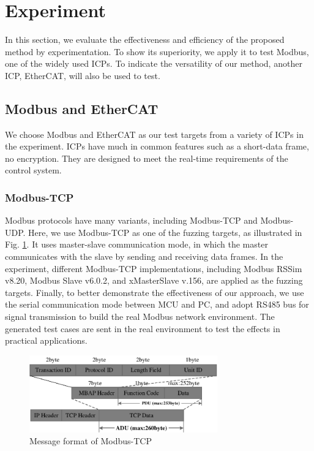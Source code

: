 \section{Experiment}
In this section, we evaluate the effectiveness and efficiency of the proposed method by experimentation. To show its superiority, we apply it to test Modbus, one of the widely used ICPs. To indicate the versatility of our method, another ICP, EtherCAT, will also be used to test.

\subsection{Modbus and EtherCAT}
We choose Modbus and EtherCAT as our test targets from a variety of ICPs in the experiment. ICPs have much in common features such as a short-data frame, no encryption. They are designed to meet the real-time requirements of the control system.
\subsubsection{Modbus-TCP}
Modbus protocols have many variants, including Modbus-TCP and Modbus-UDP. Here, we use Modbus-TCP as one of the fuzzing targets, as illustrated in Fig. \ref{FigModbusFormat}. It uses master-slave communication mode, in which the master communicates with the slave by sending and receiving data frames. In the experiment, different Modbus-TCP implementations, including Modbus RSSim v8.20, Modbus Slave v6.0.2, and xMasterSlave v.156, are applied as the fuzzing targets. Finally, to better demonstrate the effectiveness of our approach, we use the serial communication mode between MCU \cite{roberts1972microprogrammed} and PC, and adopt RS485 bus \cite{feng2012design} for signal transmission to build the real Modbus network environment. The generated test cases are sent in the real environment to test the effects in practical applications.
\begin{figure}[htbp]   %
	\centering 
	\includegraphics[width=3.2in]{FIGURE_LV/FigModbusFormat.pdf}
	\caption{Message format of Modbus-TCP}
	\label{FigModbusFormat}
\end{figure}

